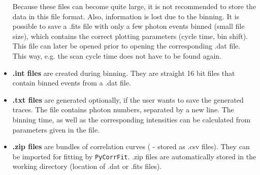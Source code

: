 \begin{itemize}
\begin{itemize}
	\end{itemize}
	Because these files can become quite large, it is not recommended to store the data in this file format. Also, information is lost due to the binning. It is possible to save a \mytilde .fits file with only a few photon events binned (small file size), which contains the correct plotting parameters (cycle time, bin shift). This file can later be opened prior to opening the corresponding \mytilde .dat file. This way, e.g. the scan cycle time does not have to be found again.

\item \textbf{\mytilde .int files} are created during binning. They are straight 16 bit files that contain binned events from a \mytilde .dat file.

\item \textbf{\mytilde .txt files} are generated optionally, if the user wants to save the generated traces. The file contains photon numbers, separated by a new line. The binning time, as well as the corresponding intensities can be calculated from parameters given in the file.

\item \textbf{\mytilde .zip files} are bundles of correlation curves ( - stored as \mytilde .csv files). They can be imported for fitting by \texttt{PyCorrFit}. \mytilde .zip files are automatically stored in the working directory (location of \mytilde .dat or \mytilde .fits files).

\end{itemize}



